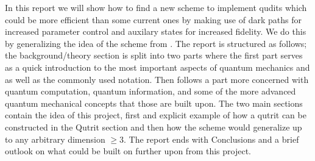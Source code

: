 In this report we will show how to find a new scheme to implement qudits which could be more efficient than some current ones by making use of dark paths for increased parameter control and auxilary states for increased fidelity. We do this by generalizing the idea of the scheme from \cite{darkpath}. The report is structured as follows; the background/theory section is split into two parts where the first part serves as a quick introduction to the most important aspects of quantum mechanics and as well as the commonly used notation. Then follows a part more concerned with quantum computation, quantum information, and some of the more advanced quantum mechanical concepts that those are built upon.
The two main sections contain the idea of this project, first and explicit example of how a qutrit can be constructed in the Qutrit section and then how the scheme would generalize up to any arbitrary dimension $\geq 3$. The report ends with Conclusions and a brief outlook on what could be built on further upon from this project.



